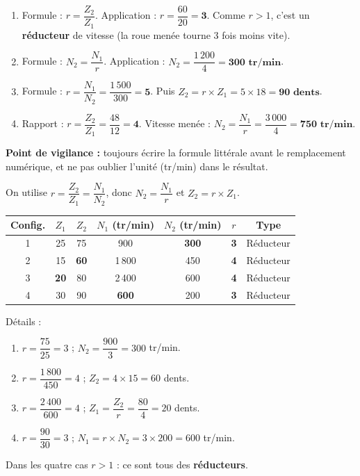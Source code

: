 \documentclass[11pt]{article}
\newcounter{popsec}
\newcounter{popsub}
\newcommand{\courssub}[1]{%
  \stepcounter{popsub}%
  \par\vspace{9pt}\noindent{\popxbold\fontsize{11.5}{13}\selectfont\color{popink}{\color{poporange}\thepopsec.\thepopsub}\hspace{6pt}#1}\par\nopagebreak\vspace{4pt}
}
\begin{document}
\begin{corrige}
\begin{enumerate}
    \item Formule : $r = \dfrac{Z_2}{Z_1}$. Application : $r = \dfrac{60}{20} = \textbf{3}$. Comme $r > 1$, c'est un \textbf{réducteur} de vitesse (la roue menée tourne 3 fois moins vite).
    \item Formule : $N_2 = \dfrac{N_1}{r}$. Application : $N_2 = \dfrac{1\,200}{4} = \textbf{300 tr/min}$.
    \item Formule : $r = \dfrac{N_1}{N_2} = \dfrac{1\,500}{300} = \textbf{5}$. Puis $Z_2 = r \times Z_1 = 5 \times 18 = \textbf{90 dents}$.
    \item Rapport : $r = \dfrac{Z_2}{Z_1} = \dfrac{48}{12} = \textbf{4}$. Vitesse menée : $N_2 = \dfrac{N_1}{r} = \dfrac{3\,000}{4} = \textbf{750 tr/min}$.
\end{enumerate}
\textbf{Point de vigilance :} toujours écrire la formule littérale avant le remplacement numérique, et ne pas oublier l'unité (tr/min) dans le résultat.
\end{corrige}

\courssub{Je m'entraîne}

\begin{corrige}
On utilise $r = \dfrac{Z_2}{Z_1} = \dfrac{N_1}{N_2}$, donc $N_2 = \dfrac{N_1}{r}$ et $Z_2 = r \times Z_1$.
\begin{center}
\begin{tabular}{|c|c|c|c|c|c|c|}\hline
\textbf{Config.} & $Z_1$ & $Z_2$ & $N_1$ (tr/min) & $N_2$ (tr/min) & $r$ & Type \\ \hline
1 & 25 & 75 & 900 & \textbf{300} & \textbf{3} & Réducteur \\ \hline
2 & 15 & \textbf{60} & 1\,800 & 450 & \textbf{4} & Réducteur \\ \hline
3 & \textbf{20} & 80 & 2\,400 & 600 & \textbf{4} & Réducteur \\ \hline
4 & 30 & 90 & \textbf{600} & 200 & \textbf{3} & Réducteur \\ \hline
\end{tabular}
\end{center}
Détails :
\begin{enumerate}
    \item $r = \dfrac{75}{25} = 3$ ; $N_2 = \dfrac{900}{3} = 300$ tr/min.
    \item $r = \dfrac{1\,800}{450} = 4$ ; $Z_2 = 4 \times 15 = 60$ dents.
    \item $r = \dfrac{2\,400}{600} = 4$ ; $Z_1 = \dfrac{Z_2}{r} = \dfrac{80}{4} = 20$ dents.
    \item $r = \dfrac{90}{30} = 3$ ; $N_1 = r \times N_2 = 3 \times 200 = 600$ tr/min.
\end{enumerate}
Dans les quatre cas $r > 1$ : ce sont tous des \textbf{réducteurs}.
\end{corrige}
\end{document}
